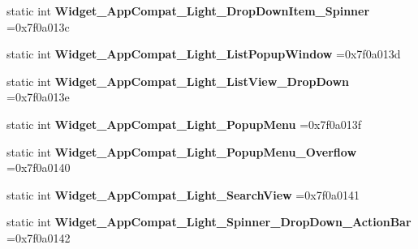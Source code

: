 \begin{DoxyCompactItemize}
\mbox{\label{classandroid_1_1support_1_1v7_1_1appcompat_1_1R_1_1style_af117d9bbdff4c1710f8d485948bd30d7}} 
static int {\bfseries Widget\+\_\+\+App\+Compat\+\_\+\+Light\+\_\+\+Drop\+Down\+Item\+\_\+\+Spinner} =0x7f0a013c
\item 
\mbox{\label{classandroid_1_1support_1_1v7_1_1appcompat_1_1R_1_1style_ae1be2655e48a38cd79d3c3406b474429}} 
static int {\bfseries Widget\+\_\+\+App\+Compat\+\_\+\+Light\+\_\+\+List\+Popup\+Window} =0x7f0a013d
\item 
\mbox{\label{classandroid_1_1support_1_1v7_1_1appcompat_1_1R_1_1style_a67f331f46a5a99a37e919cbddb45809e}} 
static int {\bfseries Widget\+\_\+\+App\+Compat\+\_\+\+Light\+\_\+\+List\+View\+\_\+\+Drop\+Down} =0x7f0a013e
\item 
\mbox{\label{classandroid_1_1support_1_1v7_1_1appcompat_1_1R_1_1style_a8419fec316686a9255165238d2cbba96}} 
static int {\bfseries Widget\+\_\+\+App\+Compat\+\_\+\+Light\+\_\+\+Popup\+Menu} =0x7f0a013f
\item 
\mbox{\label{classandroid_1_1support_1_1v7_1_1appcompat_1_1R_1_1style_ae9ee5704d42e323758afb1a203041c11}} 
static int {\bfseries Widget\+\_\+\+App\+Compat\+\_\+\+Light\+\_\+\+Popup\+Menu\+\_\+\+Overflow} =0x7f0a0140
\item 
\mbox{\label{classandroid_1_1support_1_1v7_1_1appcompat_1_1R_1_1style_aaa775c4620e5041274d127996adc01e7}} 
static int {\bfseries Widget\+\_\+\+App\+Compat\+\_\+\+Light\+\_\+\+Search\+View} =0x7f0a0141
\item 
\mbox{\label{classandroid_1_1support_1_1v7_1_1appcompat_1_1R_1_1style_aafae5d6db32fe00c94478f9b9e562874}} 
static int {\bfseries Widget\+\_\+\+App\+Compat\+\_\+\+Light\+\_\+\+Spinner\+\_\+\+Drop\+Down\+\_\+\+Action\+Bar} =0x7f0a0142
\item 
\mbox{\label{classandroid_1_1support_1_1v7_1_1appcompat_1_1R_1_1style_afce0267f0c663da3d5fc08a715783730}} 

\end{DoxyCompactItemize}
